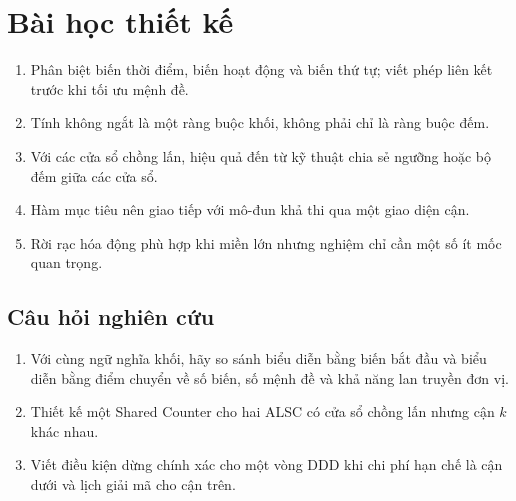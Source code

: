 \section{Bài học thiết kế}

\begin{summarybox}
\begin{enumerate}
  \item Phân biệt biến thời điểm, biến hoạt động và biến thứ tự; viết phép
        liên kết trước khi tối ưu mệnh đề.
  \item Tính không ngắt là một ràng buộc khối, không phải chỉ là ràng buộc đếm.
  \item Với các cửa sổ chồng lấn, hiệu quả đến từ kỹ thuật chia sẻ ngưỡng hoặc
        bộ đếm giữa các cửa sổ.
  \item Hàm mục tiêu nên giao tiếp với mô-đun khả thi qua một giao diện cận.
  \item Rời rạc hóa động phù hợp khi miền lớn nhưng nghiệm chỉ cần một số
        ít mốc quan trọng.
\end{enumerate}
\end{summarybox}

\subsection*{Câu hỏi nghiên cứu}
\begin{enumerate}
  \item Với cùng ngữ nghĩa khối, hãy so sánh biểu diễn bằng biến bắt đầu và biểu diễn
        bằng điểm chuyển về số biến, số mệnh đề và khả năng lan truyền đơn vị.
  \item Thiết kế một Shared Counter cho hai ALSC có cửa sổ chồng lấn nhưng cận
        \(k\) khác nhau.
  \item Viết điều kiện dừng chính xác cho một vòng DDD khi chi phí hạn chế là
        cận dưới và lịch giải mã cho cận trên.
\end{enumerate}
